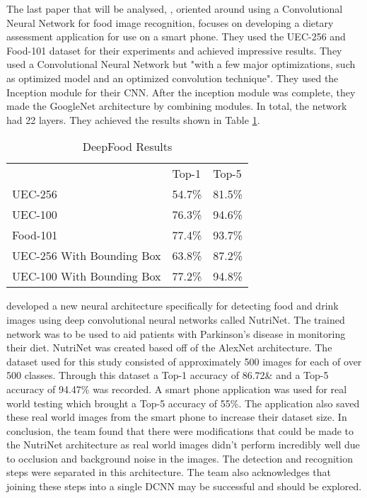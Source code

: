 The last paper that will be analysed, \textcite{deepFood}, oriented around using a Convolutional Neural
Network for food image recognition, focuses on developing a dietary assessment
application for use on a smart phone. They used the UEC-256 and Food-101 dataset
for their experiments and achieved impressive results.
They used a Convolutional Neural Network but "with a few major optimizations,
such as optimized model and an optimized convolution technique". 
They used the Inception module for their CNN. After the
inception module was complete, they made the GoogleNet architecture by combining modules. In
total, the network had 22 layers.
They achieved the results shown in Table \ref{resultsDeepFood}.

\begin{table}[h]
	\centering
	\caption{DeepFood Results}
	\label{resultsDeepFood}
	\begin{tabular}{lll}
		& Top-1  & Top-5  \\
		UEC-256                   & 54.7\% & 81.5\% \\
		UEC-100                   & 76.3\% & 94.6\% \\
		Food-101                  & 77.4\% & 93.7\% \\
		UEC-256 With Bounding Box & 63.8\% & 87.2\% \\
		  UEC-100 With Bounding Box & 77.2\% & 94.8\%
	\end{tabular}
\end{table}

\textcite{nutrinet} developed a new neural architecture specifically for detecting food and drink images using deep convolutional neural networks called NutriNet.
The trained network was to be used to aid patients with Parkinson's disease in monitoring their diet.
NutriNet was created based off of the AlexNet architecture.
The dataset used for this study consisted of approximately 500 images for each of over 500 classes.
Through this dataset a Top-1 accuracy of 86.72\& and a Top-5 accuracy of 94.47\% was recorded.
A smart phone application was used for real world testing which brought a Top-5 accuracy of 55\%.
The application also saved these real world images from the smart phone to increase their dataset size.
In conclusion, the team found that there were modifications that could be made to the NutriNet architecture as real world images didn't perform incredibly well due to occlusion and background noise in the images.
The detection and recognition steps were separated in this architecture.
The team also acknowledges that joining these steps into a single DCNN may be successful and should be explored.

